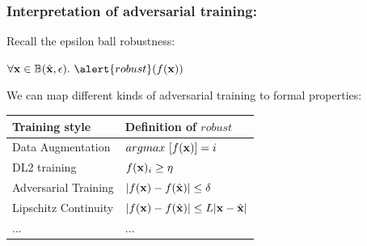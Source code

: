 \documentclass[aspectratio=169]{beamer}
\begin{document}
\begin{frame}
  \frametitle{Interpretation of adversarial training:}

  
      \begin{block}{Recall the epsilon ball robustness:}
      
       $\forall \x \in \mathbb{B}(\hat{\x}, \epsilon). \ \alert{robust}(f(\x)) $
\end{block}

     We can map different kinds of adversarial training to formal properties:
          	\begin{tabular}{p{3.5cm}|p{5.5cm}} 
		Training style & Definition of \alert{$robust$}  \\ \hline \hline
		Data Augmentation & 	$ argmax\ [f(\mathbf{x})] = i$  \\ \hline
		DL2 training & 	$f(\mathbf{x})_i \geq \eta$  \\ \hline
		Adversarial Training & 	$ |f(\mathbf{x}) - f(\hat{\mathbf{x}})| \leq \delta$ \\ \hline
          Lipschitz Continuity & 	$ |f(\mathbf{x}) - f(\hat{\mathbf{x}})| \leq L|\mathbf{x}-\hat{\mathbf{x}}|$  \\ \hline
          ... & ... \\
		
	\end{tabular}
        
        
       {\scriptsize
 \begin{thebibliography}{99}
   \beamertemplatearticlebibitems
\end{thebibliography}}
 
 

    
  \end{frame}
\end{document}
